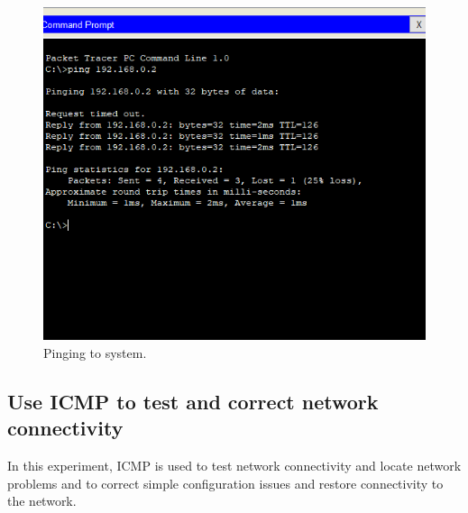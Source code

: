 \documentclass[12pt,a4paper]{article}
\begin{document}
\begin{figure}[h]
 		\centering
				\includegraphics[scale=0.75]{4.10.png}	


			\caption{Pinging to system.}
			\label{fig:AP}
	\end{figure}
\pagebreak
\subsection{Use ICMP to  test and correct network connectivity}
In this experiment, ICMP is used to test network connectivity and locate network problems and to correct simple configuration issues and restore connectivity to the network.\\
\end{document}
